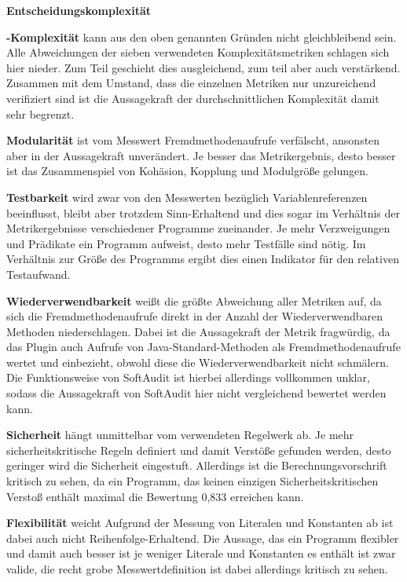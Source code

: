 \documentclass[gb,ngerman]{stthesis}
\begin{document}
\begin{labeling}{\textbf{Entscheidungskomplexität}}
				\item[\textbf{\diameter -Komplexität}] kann aus den oben genannten Gründen nicht gleichbleibend sein. Alle Abweichungen der sieben verwendeten Komplexitätsmetriken schlagen sich hier nieder. Zum Teil geschieht dies ausgleichend, zum teil aber auch verstärkend. Zusammen mit dem Umstand, dass die einzelnen Metriken nur unzureichend verifiziert sind ist die Aussagekraft der durchschnittlichen Komplexität damit sehr begrenzt. 
				\item[\textbf{Modularität}] ist vom Messwert Fremdmethodenaufrufe verfälscht, ansonsten aber in der Aussagekraft unverändert. Je besser das Metrikergebnis, desto besser ist das Zusammenspiel von Kohäsion, Kopplung und Modulgröße gelungen.
				\item[\textbf{Testbarkeit}] wird zwar von den Messwerten bezüglich Variablenreferenzen beeinflusst, bleibt aber trotzdem Sinn-Erhaltend und dies sogar im Verhältnis der Metrikergebnisse verschiedener Programme zueinander. Je mehr Verzweigungen und Prädikate ein Programm aufweist, desto mehr Testfälle sind nötig. Im Verhältnis zur Größe des Programms ergibt dies einen Indikator für den relativen Testaufwand.
				\item[\textbf{Wiederverwendbarkeit}] weißt die größte Abweichung aller Metriken auf, da sich die Fremdmethodenaufrufe direkt in der Anzahl der Wiederverwendbaren Methoden niederschlagen.  Dabei ist die Aussagekraft der Metrik fragwürdig, da das Plugin auch Aufrufe von Java-Standard-Methoden als Fremdmethodenaufrufe wertet und einbezieht, obwohl diese die Wiederverwendbarkeit nicht schmälern. Die Funktionsweise von SoftAudit ist hierbei allerdings vollkommen unklar, sodass die Aussagekraft von SoftAudit hier nicht vergleichend bewertet werden kann.
				\item[\textbf{Sicherheit}] hängt unmittelbar vom verwendeten Regelwerk ab. Je mehr sicherheitskritische Regeln definiert und damit Verstöße gefunden werden, desto geringer wird die Sicherheit eingestuft. Allerdings ist die Berechnungsvorschrift kritisch zu sehen, da ein Programm, das keinen einzigen Sicherheitskritischen Verstoß enthält maximal die Bewertung 0,833 erreichen kann.
				\item[\textbf{Flexibilität}] weicht Aufgrund der Messung von Literalen und Konstanten ab ist dabei auch nicht Reihenfolge-Erhaltend. Die Aussage, das ein Programm flexibler und damit auch besser ist je weniger Literale und Konstanten es enthält ist zwar valide, die recht grobe Messwertdefinition ist dabei allerdings kritisch zu sehen.

\end{labeling}
\end{document}

